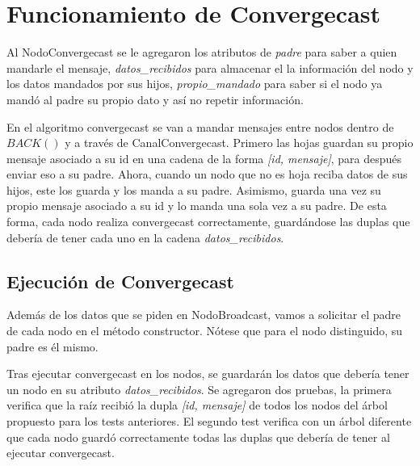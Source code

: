 
\section{Funcionamiento de Convergecast}

Al NodoConvergecast se le agregaron los atributos de \textit{padre} para saber a quien mandarle el mensaje, \textit{datos\_recibidos} para almacenar el la información del nodo y los datos mandados por sus hijos, \textit{propio\_mandado} para saber si el nodo ya mandó al padre su propio dato y así no repetir información.

En el algoritmo convergecast se van a mandar mensajes entre nodos dentro de $BACK()$ y a través de CanalConvergecast. Primero las hojas guardan su propio mensaje asociado a su id en una cadena de la forma \textit{[id, mensaje]}, para después enviar eso a su padre. Ahora, cuando un nodo que no es hoja reciba datos de sus hijos, este los guarda y los manda a su padre. Asimismo, guarda una vez su propio mensaje asociado a su id y lo manda una sola vez a su padre. De esta forma, cada nodo realiza convergecast correctamente, guardándose las duplas que debería de tener cada uno en la cadena \textit{datos\_recibidos}.

\subsection*{Ejecución de Convergecast}

Además de los datos que se piden en NodoBroadcast, vamos a solicitar el padre de cada nodo en el método constructor. Nótese que para el nodo distinguido, su padre es él mismo.

Tras ejecutar convergecast en los nodos, 
se guardarán los datos que debería tener un nodo en su atributo \textit{datos\_recibidos}. 
Se agregaron dos pruebas, la primera verifica que la raíz recibió la dupla \textit{[id, mensaje]} de todos los nodos del árbol propuesto para los tests anteriores. El segundo test verifica con un árbol diferente que cada nodo guardó correctamente todas las duplas que debería de tener al ejecutar convergecast.
